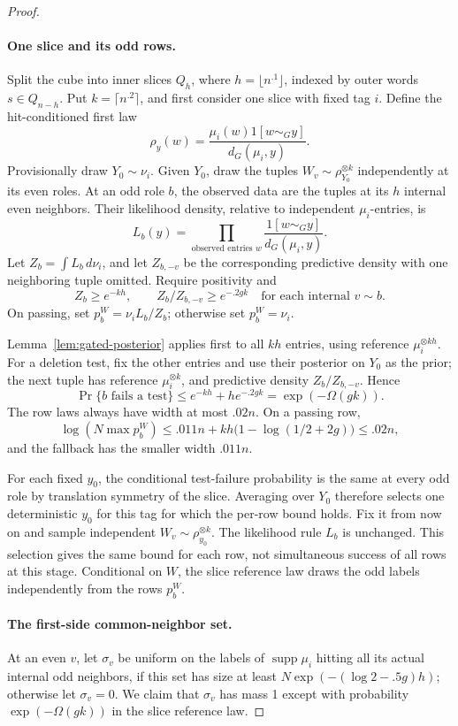 \begin{proof}
\paragraph{One slice and its odd rows.}
Split the cube into inner slices \(Q_h\), where \(h=\lfloor n^{.1}\rfloor\), indexed by outer words \(s\in Q_{n-h}\). Put \(k=\lceil n^{.2}\rceil\), and first consider one slice with fixed tag \(i\). Define the hit-conditioned first law
\[
 \rho_y(w)=\frac{\mu_i(w)1[w\sim_Gy]}{d_G(\mu_i,y)}.
\]
Provisionally draw \(Y_0\sim\nu_i\). Given \(Y_0\), draw the tuples \(W_v\sim\rho_{Y_0}^{\otimes k}\) independently at its even roles. At an odd role \(b\), the observed data are the tuples at its \(h\) internal even neighbors. Their likelihood density, relative to independent \(\mu_i\)-entries, is
\[
 L_b(y)=\prod_{\text{observed entries }w}
           \frac{1[w\sim_Gy]}{d_G(\mu_i,y)}.
\]
Let \(Z_b=\int L_b\,d\nu_i\), and let \(Z_{b,-v}\) be the corresponding predictive density with one neighboring tuple omitted. Require positivity and
\[
 Z_b\ge e^{-kh},\qquad Z_b/Z_{b,-v}\ge e^{-.2gk}
          \quad\text{for each internal }v\sim b.
\]
On passing, set \(p_b^W=\nu_iL_b/Z_b\); otherwise set \(p_b^W=\nu_i\).

Lemma~\ref{lem:gated-posterior} applies first to all \(kh\) entries, using reference \(\mu_i^{\otimes kh}\). For a deletion test, fix the other entries and use their posterior on \(Y_0\) as the prior; the next tuple has reference \(\mu_i^{\otimes k}\), and predictive density \(Z_b/Z_{b,-v}\). Hence
\[
 \Pr\{b\text{ fails a test}\}
       \le e^{-kh}+h e^{-.2gk}=\exp(-\Omega(gk)).
\]
The row laws always have width at most \(.02n\). On a passing row,
\[
 \log(N\max p_b^W)
 \le .011n+kh\bigl(1-\log(1/2+2g)\bigr)
 \le .02n,
\]
and the fallback has the smaller width \(.011n\).

For each fixed \(y_0\), the conditional test-failure probability is the same at every odd role by translation symmetry of the slice. Averaging over \(Y_0\) therefore selects one deterministic \(y_0\) for this tag for which the per-row bound holds. Fix it from now on and sample independent \(W_v\sim\rho_{y_0}^{\otimes k}\). The likelihood rule \(L_b\) is unchanged. This selection gives the same bound for each row, not simultaneous success of all rows at this stage. Conditional on \(W\), the slice reference law draws the odd labels independently from the rows \(p_b^W\).

\paragraph{The first-side common-neighbor set.}
At an even \(v\), let \(\sigma_v\) be uniform on the labels of \(\operatorname{supp}\mu_i\) hitting all its actual internal odd neighbors, if this set has size at least
\(N\exp(- (\log2-.5g)h)\); otherwise let \(\sigma_v=0\).
We claim that \(\sigma_v\) has mass 1 except with probability \(\exp(-\Omega(gk))\) in the slice reference law.


\end{proof}
